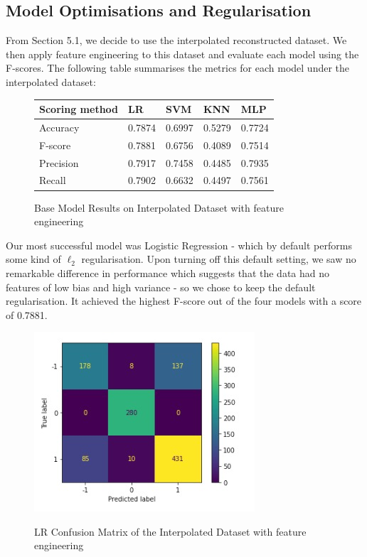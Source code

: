 \documentclass[8pt]{article}
\begin{document}
\subsection{Model Optimisations and Regularisation}
From Section 5.1, we decide to use the interpolated reconstructed dataset. We then apply feature engineering to this dataset and evaluate each model using the F-scores. The following table summarises the metrics for each model under the interpolated dataset:
\begin{figure}[H]
    \centering
    \begin{tabular}{ |p{3cm}||p{3cm}|p{3cm}|p{3cm}|p{3cm}| }
 \hline
 Scoring method & LR & SVM & KNN & MLP\\
 \hline
 Accuracy & 0.7874 & 0.6997 & 0.5279 & 0.7724\\
 F-score & 0.7881 & 0.6756 & 0.4089 & 0.7514\\
 Precision & 0.7917 & 0.7458 & 0.4485 & 0.7935\\
 Recall & 0.7902 & 0.6632 & 0.4497 & 0.7561\\
\hline
\end{tabular}
    \caption{Base Model Results on Interpolated Dataset with feature engineering}
    \label{fig:tableC}
\end{figure}

Our most successful model was Logistic Regression - which by default performs some kind of $\ell_2$ regularisation. Upon turning off this default setting, we saw no remarkable difference in performance which suggests that the data had no features of low bias and high variance - so we chose to keep the default regularisation. It achieved the highest F-score out of the four models with a score of 0.7881. 

\begin{figure}[H]
    \centering
    \includegraphics[scale=.5]{lr_cm_interpolated.jpeg}
    \label{fig:my_label}
    \caption{LR Confusion Matrix of the Interpolated Dataset with feature engineering}
\end{figure}
\end{document}
